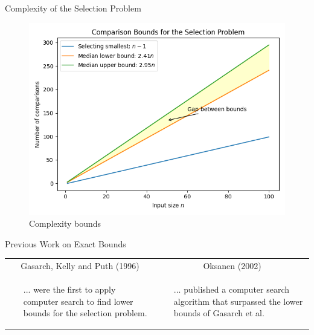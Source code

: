 \begin{frame}{Complexity of the Selection Problem}
  \begin{figure}
    \includegraphics[height=0.65\textheight]{figures/bounds_diagram.png}
    \caption{Complexity bounds}
  \end{figure}
\end{frame}

\begin{frame}{Previous Work on Exact Bounds}
  \begin{tabular}{|p{6cm}|p{6cm}|}
    \hline
    \multicolumn{1}{|c|}{Gasarch, Kelly and Puth (1996)}                                               & \multicolumn{1}{c|}{Oksanen (2002)} \\
    \cline{1-2}
    \raggedright \begin{itemize}
                   \item [...]were the first to apply computer search to find lower bounds for the selection problem.
                 \end{itemize} &
    \begin{itemize}
      \item[...] published a computer search algorithm that surpassed the lower bounds of Gasarch et al.
    \end{itemize}                                        \\
    \cline{1-2}
  \end{tabular}

\end{frame}

